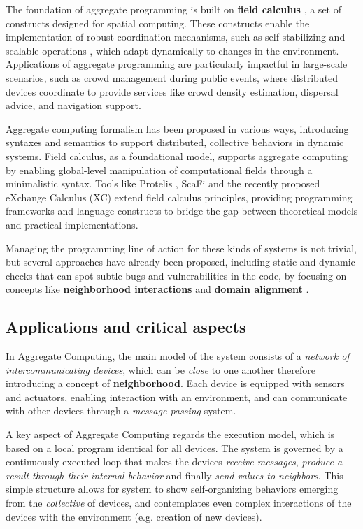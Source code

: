 \documentclass[12pt,a4paper,openright,twoside]{book}
\begin{document}
The foundation of aggregate programming is built on \textbf{field calculus}
\cite{Beal2014TowardsAU}, a set of constructs designed for spatial computing.
These constructs enable the implementation of robust coordination mechanisms,
such as self-stabilizing and scalable operations \cite{Viroli2018}
\cite{DBLP:journals/jlap/ViroliBDACP19}, which adapt dynamically to changes in
the environment. Applications of aggregate programming are particularly
impactful in large-scale scenarios, such as crowd management during public
events, where distributed devices coordinate to provide services like crowd
density estimation, dispersal advice, and navigation support.

Aggregate computing formalism has been proposed in various ways, introducing
syntaxes and semantics to support distributed, collective behaviors in dynamic
systems. Field calculus, as a foundational model, supports aggregate computing
by enabling global-level manipulation of computational fields through a
minimalistic syntax. 
%
Tools like Protelis \cite{DBLP:conf/saso/PianiniBV17}, ScaFi
\cite{DBLP:conf/ecoop/CasadeiV16} and the recently proposed eXchange Calculus
(XC) \cite{DBLP:journals/jss/AudritoCDSV24} extend field calculus principles,
providing programming frameworks and language constructs to bridge the gap
between theoretical models and practical implementations.

Managing the programming line of action for these kinds of systems is not
trivial, but several approaches have already been proposed, including static and
dynamic checks that can spot subtle bugs and vulnerabilities in the code, by
focusing on concepts like \textbf{neighborhood interactions} and \textbf{domain
alignment} \cite{DBLP:conf/saso/AudritoDVC16}.

\subsection{Applications and critical aspects}

In Aggregate Computing, the main model of the system consists of a \emph{network of 
intercommunicating devices}, which can be \emph{close} to one another therefore 
introducing a concept of \textbf{neighborhood}. 
%
Each device is equipped with sensors and actuators, enabling interaction with an
environment, and can communicate with other devices through a
\emph{message-passing} system. 

A key aspect of Aggregate Computing regards the execution model, which is based
on a local program identical for all devices. The system is governed by a
continuously executed loop that makes the devices \emph{receive messages},
\emph{produce a result through their internal behavior} and finally \emph{send
values to neighbors}. 
%
This simple structure allows for system to show self-organizing behaviors
emerging from the \emph{collective} of devices, and contemplates even complex
interactions of the devices with the environment (e.g. creation of new devices).
\end{document}
